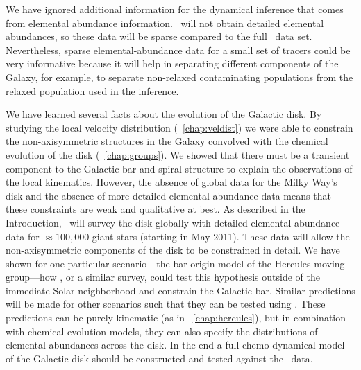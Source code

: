 We have ignored additional information for the dynamical inference
that comes from elemental abundance information. \Gaia\ will not
obtain detailed elemental abundances, so these data will be sparse
compared to the full \Gaia\ data set. Nevertheless, sparse
elemental-abundance data for a small set of tracers could be very
informative because it will help in separating different components of
the Galaxy, for example, to separate non-relaxed contaminating
populations from the relaxed population used in the inference.


We have learned several facts about the evolution of the Galactic
disk. By studying the local velocity distribution
(\chaptername~\ref{chap:veldist}) we were able to constrain the
non-axisymmetric structures in the Galaxy convolved with the chemical
evolution of the disk (\chaptername~\ref{chap:groups}). We showed that
there must be a transient component to the Galactic bar and spiral
structure to explain the observations of the local
kinematics. However, the absence of global data for the Milky Way's
disk and the absence of more detailed elemental-abundance data means
that these constraints are weak and qualitative at best. As described
in the Introduction, \apogee\ will survey the disk globally with
detailed elemental-abundance data for $\approx 100,000$ giant stars
(starting in May 2011). These data will allow the non-axisymmetric
components of the disk to be constrained in detail. We have shown for
one particular scenario---the bar-origin model of the Hercules moving
group---how \apogee, or a similar survey, could test this hypothesis
outside of the immediate Solar neighborhood and constrain the Galactic
bar. Similar predictions will be made for other scenarios such that
they can be tested using \apogee. These predictions can be purely
kinematic (as in \chaptername~\ref{chap:hercules}), but in combination
with chemical evolution models, they can also specify the
distributions of elemental abundances across the disk. In the end a
full chemo-dynamical model of the Galactic disk should be constructed
and tested against the \apogee\ data.

